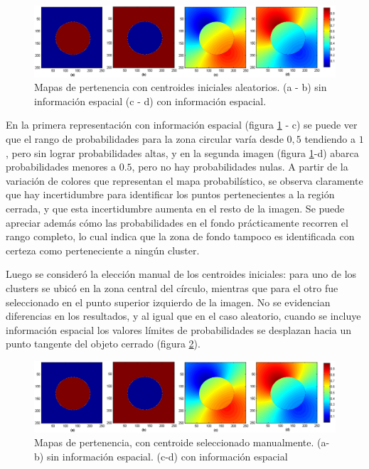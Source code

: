 \begin{figure}[H]
\centering
\includegraphics[scale=0.08]{images/circulo-001.jpg}
\caption{Mapas de pertenencia con centroides iniciales aleatorios. (a - b)  sin información espacial (c - d) con información espacial.}
\label{fig:circulo_aleatorio}
\end{figure}

En la primera representación con información espacial (figura \ref{fig:circulo_aleatorio} - c) se puede ver que el rango de probabilidades para la zona circular varía desde $0,5$ tendiendo a $1$, pero sin lograr probabilidades altas, y en la segunda imagen (figura \ref{fig:circulo_aleatorio}-d) abarca probabilidades menores a $0.5$, pero no hay probabilidades nulas. A partir de la variación de colores que representan el mapa probabilístico, se observa claramente que hay incertidumbre para identificar los puntos pertenecientes a la región cerrada, y que esta incertidumbre aumenta en el resto de la imagen. Se puede apreciar además cómo las probabilidades en el fondo prácticamente recorren el rango completo, lo cual indica que la zona de fondo tampoco  es identificada con certeza como perteneciente a ningún cluster.

Luego se consideró la elección manual de los centroides iniciales: para uno de los clusters se ubicó en la zona central del círculo, mientras que para el otro fue seleccionado en el punto superior izquierdo de la imagen. No se evidencian diferencias en los resultados, y al igual que en el caso aleatorio, cuando se incluye información espacial los valores límites de probabilidades se desplazan hacia un punto tangente del objeto cerrado (figura \ref{fig:circulo_aleatorio_centr_manual}).

\begin{figure}[H]
\centering
\includegraphics[scale=0.08]{images/circulo-001.jpg}
\caption{Mapas de pertenencia, con centroide seleccionado manualmente. (a-b) sin información espacial. (c-d) con información espacial}
\label{fig:circulo_aleatorio_centr_manual}
\end{figure}

